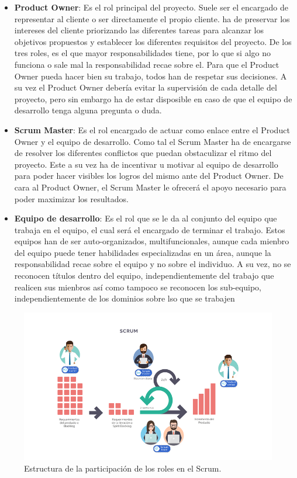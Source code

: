 \begin{itemize}
	\item \textbf{Product Owner}: Es el rol principal del proyecto. Suele ser el encargado de representar al cliente o ser directamente el propio cliente. ha de preservar los intereses del cliente priorizando las diferentes tareas para alcanzar los objetivos propuestos y establecer los diferentes requisitos del proyecto. De los tres roles, es el que mayor responsabilidades tiene, por lo que si algo no funciona o sale mal la responsabilidad recae sobre el. Para que el Product Owner pueda hacer bien su trabajo, todos han de respetar sus decisiones. A su vez el Product Owner debería evitar la supervisión de cada detalle del proyecto, pero sin embargo ha de estar disposible en caso de que el equipo de desarrollo tenga alguna pregunta o duda.
	\item \textbf{Scrum Master}: Es el rol encargado de actuar como enlace entre el Product Owner y el equipo de desarrollo. Como tal el Scrum Master ha de encargarse de resolver los diferentes conflictos que puedan obstaculizar el ritmo del proyecto. Este a su vez ha de incentivar u motivar al equipo de desarrollo para poder hacer visibles los logros del mismo ante del Product Owner. De cara al Product Owner, el Scrum Master le ofrecerá el apoyo necesario para poder maximizar los resultados.
	\item \textbf{Equipo de desarrollo}: Es el rol que se le da al conjunto del equipo que trabaja en el equipo, el cual será el encargado de terminar el trabajo. Estos equipos han de ser auto-organizados, multifuncionales, aunque cada mienbro del equipo puede tener habilidades especializadas en un área, aunque la responsabilidad recae sobre el equipo y no sobre el individuo. A su vez, no se reconocen títulos dentro del equipo, independientemente del trabajo que realicen sus mienbros así como tampoco se reconocen  los sub-equipo, independientemente de los dominios sobre lso que se trabajen
\end{itemize}

\begin{figure}[H]
	\centering
	\includegraphics[width=1\textwidth]{img/roles-scrum}
	\caption{Estructura de la participación de los roles en el Scrum.}
	\label{fig:roles-scrum}
\end{figure}

